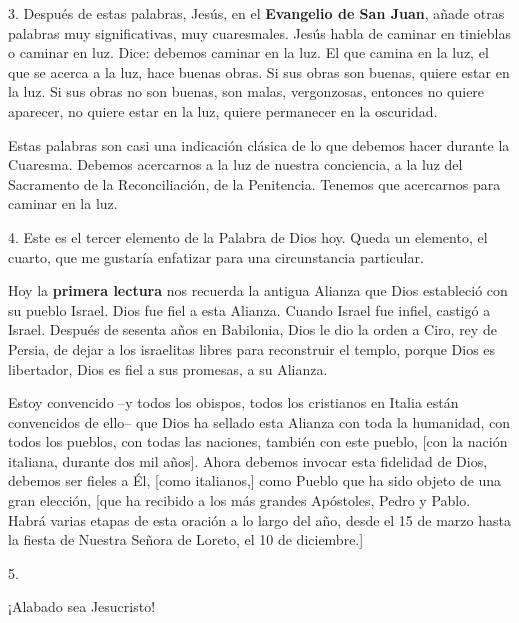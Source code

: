 \begin{body}
3. Después de estas palabras, Jesús, en el \textbf{Evangelio de San Juan}, añade otras palabras muy significativas, muy cuaresmales. Jesús habla de caminar en tinieblas o caminar en luz. Dice: debemos caminar en la luz. El que camina en la luz, el que se acerca a la luz, hace buenas obras. Si sus obras son buenas, quiere estar en la luz. Si sus obras no son buenas, son malas, vergonzosas, entonces no quiere aparecer, no quiere estar en la luz, quiere permanecer en la oscuridad.

Estas palabras son casi una indicación clásica de lo que debemos hacer durante la Cuaresma. Debemos acercarnos a la luz de nuestra conciencia, a la luz del Sacramento de la Reconciliación, de la Penitencia. Tenemos que acercarnos para caminar en la luz.

4. Este es el tercer elemento de la Palabra de Dios hoy. Queda un elemento, el cuarto, que me gustaría enfatizar para una circunstancia particular.


Hoy la \textbf{primera lectura} nos recuerda la antigua Alianza que Dios estableció con su pueblo Israel. Dios fue fiel a esta Alianza. Cuando Israel fue infiel, castigó a Israel. Después de sesenta años en Babilonia, Dios le dio la orden a Ciro, rey de Persia, de dejar a los israelitas libres para reconstruir el templo, porque Dios es libertador, Dios es fiel a sus promesas, a su Alianza.

Estoy convencido –y todos los obispos, todos los cristianos en Italia están convencidos de ello– que Dios ha sellado esta Alianza con toda la humanidad, con todos los pueblos, con todas las naciones, también con este pueblo, [con la nación italiana, durante dos mil años]. Ahora debemos invocar esta fidelidad de Dios, debemos ser fieles a Él, [como italianos,] como Pueblo que ha sido objeto de una gran elección, [que ha recibido a los más grandes Apóstoles, Pedro y Pablo. Habrá varias etapas de esta oración a lo largo del año, desde el 15 de marzo hasta la fiesta de Nuestra Señora de Loreto, el 10 de diciembre.]

5. 

¡Alabado sea Jesucristo!
\end{body}

